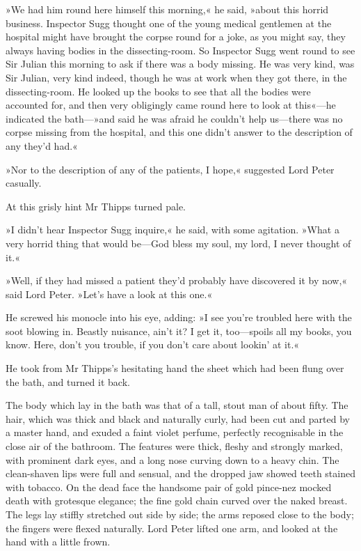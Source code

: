 »We had him round here himself this morning,« he said, »about this horrid business. Inspector Sugg thought one of the young medical gentlemen at the hospital might have brought the corpse round for a joke, as you might say, they always having bodies in the dissecting-room. So Inspector Sugg went round to see Sir Julian this morning to ask if there was a body missing. He was very kind, was Sir Julian, very kind indeed, though he was at work when they got there, in the dissecting-room. He looked up the books to see that all the bodies were accounted for, and then very obligingly came round here to look at this«---he indicated the bath---»and said he was afraid he couldn't help us\allowbreak---\allowbreak there was no corpse missing from the hospital, and this one didn't answer to the description of any they'd had.«

»Nor to the description of any of the patients, I hope,« suggested Lord Peter casually.

At this grisly hint Mr Thipps turned pale.

»I didn't hear Inspector Sugg inquire,« he said, with some agitation. »What a very horrid thing that would be\allowbreak---\allowbreak God bless my soul, my lord, I never thought of it.«

»Well, if they had missed a patient they'd probably have discovered it by now,« said Lord Peter. »Let's have a look at this one.«

He screwed his monocle into his eye, adding: »I see you're troubled here with the soot blowing in. Beastly nuisance, ain't it? I get it, too\allowbreak---\allowbreak spoils all my books, you know. Here, don't you trouble, if you don't care about lookin' at it.«

He took from Mr Thipps's hesitating hand the sheet which had been flung over the bath, and turned it back.

The body which lay in the bath was that of a tall, stout man of about fifty. The hair, which was thick and black and naturally curly, had been cut and parted by a master hand, and exuded a faint violet perfume, perfectly recognisable in the close air of the bathroom. The features were thick, fleshy and strongly marked, with prominent dark eyes, and a long nose curving down to a heavy chin. The clean-shaven lips were full and sensual, and the dropped jaw showed teeth stained with tobacco. On the dead face the handsome pair of gold pince-nez mocked death with grotesque elegance; the fine gold chain curved over the naked breast. The legs lay stiffly stretched out side by side; the arms reposed close to the body; the fingers were flexed naturally. Lord Peter lifted one arm, and looked at the hand with a little frown.

